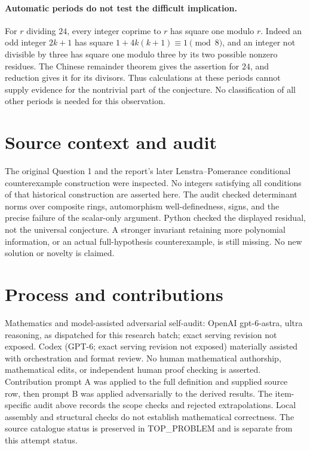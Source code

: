 \documentclass[11pt]{article}
\begin{document}
\paragraph{Automatic periods do not test the difficult implication.}
For $r$ dividing $24$, every integer coprime to $r$ has square one
modulo $r$. Indeed an odd integer $2k+1$ has square
$1+4k(k+1)\equiv1\pmod8$, and an integer not divisible by three
has square one modulo three by its two possible nonzero residues.
The Chinese remainder theorem gives the assertion for $24$, and
reduction gives it for its divisors. Thus calculations at these periods
cannot supply evidence for the nontrivial part of the conjecture.
No classification of all other periods is needed for this observation.

\section{Source context and audit}
The original Question 1 and the report's later Lenstra--Pomerance
conditional counterexample construction were inspected. No integers
satisfying all conditions of that historical construction are asserted
here. The audit checked determinant norms over composite rings,
automorphism well-definedness, signs, and the precise failure of the
scalar-only argument. Python checked the displayed residual, not the
universal conjecture. A stronger invariant retaining more polynomial
information, or an actual full-hypothesis counterexample, is still
missing. No new solution or novelty is claimed.

\section{Process and contributions}
Mathematics and model-assisted adversarial self-audit: OpenAI gpt-6-astra, ultra reasoning, as dispatched for this research batch; exact serving revision not exposed. Codex (GPT-6; exact serving revision not exposed) materially assisted with orchestration and format review. No human mathematical authorship, mathematical edits, or independent human proof checking is asserted.
Contribution prompt A was applied to the full definition and supplied source row, then prompt B was applied adversarially to the derived results. The item-specific audit above records the scope checks and rejected extrapolations. Local assembly and structural checks do not establish mathematical correctness. The source catalogue status is preserved in TOP\_PROBLEM and is separate from this attempt status.
\end{document}
